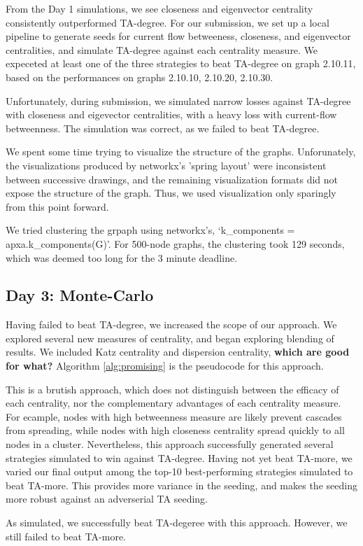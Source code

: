 \documentclass[letterpaper, 11pt]{article}
\begin{document}
From the Day 1 simulations, we see closeness and eigenvector centrality consistently outperformed TA-degree. For our submission, we set up a local pipeline to generate seeds for current flow betweeness, closeness, and eigenvector centralities, and simulate TA-degree against each centrality measure. We expeceted at least one of the three strategies to beat TA-degree on graph 2.10.11, based on the performances on graphs 2.10.10, 2.10.20, 2.10.30.
\par
Unfortunately, during submission, we simulated narrow losses against TA-degree with closeness and eigevector centralities, with a heavy loss with current-flow betweenness. The simulation was correct, as we failed to beat TA-degree.
\par
We spent some time trying to visualize the structure of the graphs. Unforunately, the visualizations produced by networkx's 'spring layout' were inconsistent between successive drawings, and the remaining visualization formats did not expose the structure of the graph. Thus, we used visualization only sparingly from this point forward.
\par
We tried clustering the grpaph using networkx's, ‘k\_components = apxa.k\_components(G)’. For 500-node graphs, the clustering took 129 seconds, which was deemed too long for the 3 minute deadline.

\subsection{Day 3: Monte-Carlo}
Having failed to beat TA-degree, we increased the scope of our approach. We explored several new measures of centrality, and began exploring blending of results. We included Katz centrality and dispersion centrality, \textbf{which are good for what?} Algorithm \ref{alg:promising} is the pseudocode for this approach.
\par
This is a brutish approach, which does not distinguish between the efficacy of each centrality, nor the complementary advantages of each centrality measure. For ecample, nodes with high betweenness measure are likely prevent cascades from spreading, while nodes with high closeness centrality spread quickly to all nodes in a cluster. Nevertheless, this approach successfully generated several strategies simulated to win against TA-degree. Having not yet beat TA-more, we varied our final output among the top-10 best-performing strategies simulated to beat TA-more. This provides more variance in the seeding, and makes the seeding more robust against an adverserial TA seeding.
\par
As simulated, we successfully beat TA-degeree with this approach. However, we still failed to beat TA-more.
\end{document}
